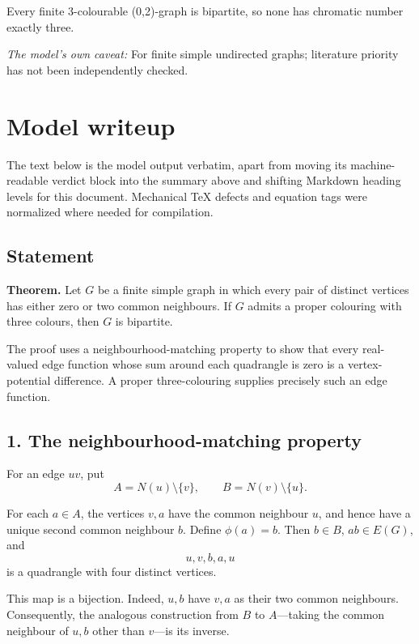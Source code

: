 \documentclass[
  11pt,
  a4paper,
]{article}
\newcounter{none} %
\begin{document}
Every finite 3-colourable (0,2)-graph is bipartite, so none has
chromatic number exactly three.

\emph{The model's own caveat:} For finite simple undirected graphs;
literature priority has not been independently checked.

\section{Model writeup}\label{model-writeup}

The text below is the model output verbatim, apart from moving its
machine-readable verdict block into the summary above and shifting
Markdown heading levels for this document. Mechanical TeX defects and
equation tags were normalized where needed for compilation.

\subsection{Statement}\label{statement}

\textbf{Theorem.} Let \(G\) be a finite simple graph in which every pair
of distinct vertices has either zero or two common neighbours. If \(G\)
admits a proper colouring with three colours, then \(G\) is bipartite.

The proof uses a neighbourhood-matching property to show that every
real-valued edge function whose sum around each quadrangle is zero is a
vertex-potential difference. A proper three-colouring supplies precisely
such an edge function.

\subsection{1. The neighbourhood-matching
property}\label{the-neighbourhood-matching-property}

For an edge \(uv\), put \[
A=N(u)\setminus\{v\},\qquad B=N(v)\setminus\{u\}.
\]

For each \(a\in A\), the vertices \(v,a\) have the common neighbour
\(u\), and hence have a unique second common neighbour \(b\). Define
\(\phi(a)=b\). Then \(b\in B\), \(ab\in E(G)\), and \[
u,v,b,a,u
\] is a quadrangle with four distinct vertices.

This map is a bijection. Indeed, \(u,b\) have \(v,a\) as their two
common neighbours. Consequently, the analogous construction from \(B\)
to \(A\)---taking the common neighbour of \(u,b\) other than \(v\)---is
its inverse.
\end{document}
